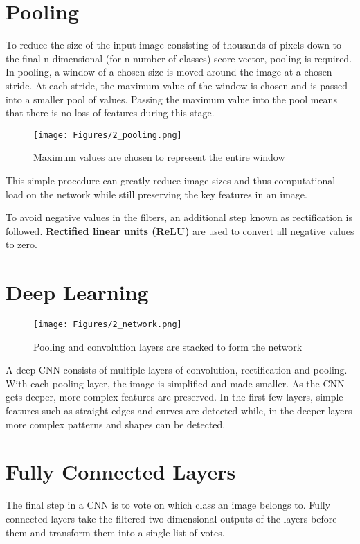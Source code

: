 \section*{Pooling}
To reduce the size of the input image consisting of thousands of pixels down to the final n-dimensional (for n number of classes) score vector, pooling is required. In pooling, a window of a chosen size is moved around the image at a chosen stride. At each stride, the maximum value of the window is chosen and is passed into a smaller pool of values. Passing the maximum value into the pool means that there is no loss of features during this stage.

\begin{figure}[!ht]
\centering
\texttt{[image: Figures/2\_pooling.png]}
\decoRule
\caption[Pooling]{Maximum values are chosen to represent the entire window \parencite{convolution2}}
\label{fig:2:pooling}
\end{figure}

This simple procedure can greatly reduce image sizes and thus computational load on the network while still preserving the key features in an image.

To avoid negative values in the filters, an additional step known as rectification is followed. \textbf{Rectified linear units (ReLU)} are used to convert all negative values to zero.

\section*{Deep Learning}

\begin{figure}[!ht]
\centering
\texttt{[image: Figures/2\_network.png]}
\decoRule
\caption[Deep Learning]{Pooling and convolution layers are stacked to form the network \parencite{convolution2}}
\label{fig:2:deeplearning}
\end{figure}

A deep CNN consists of multiple layers of convolution, rectification and pooling. With each pooling layer, the image is simplified and made smaller. As the CNN gets deeper, more complex features are preserved. In the first few layers, simple features such as straight edges and curves are detected while, in the deeper layers more complex patterns and shapes can be detected.

\section*{Fully Connected Layers}
The final step in a CNN is to vote on which class an image belongs to. Fully connected layers take the filtered two-dimensional outputs of the layers before them and transform them into a single list of votes.


